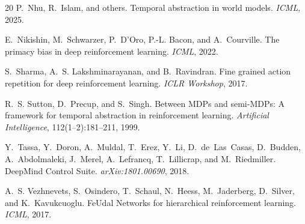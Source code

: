 \documentclass[10pt,letterpaper]{article}
\begin{document}
{\begin{thebibliography}{20}
P.~Nhu, R.~Islam, and others.
\newblock Temporal abstraction in world models.
\newblock \emph{ICML}, 2025.

E.~Nikishin, M.~Schwarzer, P.~D'Oro, P.-L. Bacon, and A.~Courville.
\newblock The primacy bias in deep reinforcement learning.
\newblock \emph{ICML}, 2022.

S.~Sharma, A.~S. Lakshminarayanan, and B.~Ravindran.
\newblock Fine grained action repetition for deep reinforcement learning.
\newblock \emph{ICLR Workshop}, 2017.

R.~S. Sutton, D.~Precup, and S.~Singh.
\newblock Between MDPs and semi-MDPs: A framework for temporal abstraction in reinforcement learning.
\newblock \emph{Artificial Intelligence}, 112(1--2):181--211, 1999.

Y.~Tassa, Y.~Doron, A.~Muldal, T.~Erez, Y.~Li, D.~de~Las~Casas, D.~Budden, A.~Abdolmaleki, J.~Merel, A.~Lefrancq, T.~Lillicrap, and M.~Riedmiller.
\newblock DeepMind Control Suite.
\newblock \emph{arXiv:1801.00690}, 2018.

A.~S. Vezhnevets, S.~Osindero, T.~Schaul, N.~Heess, M.~Jaderberg, D.~Silver, and K.~Kavukcuoglu.
\newblock FeUdal Networks for hierarchical reinforcement learning.
\newblock \emph{ICML}, 2017.

\end{thebibliography}
}
\end{document}

